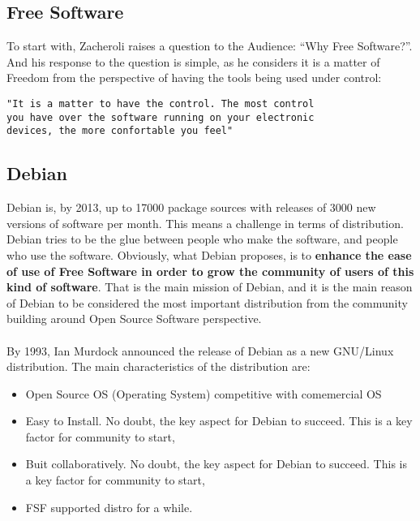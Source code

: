 \documentclass[11pt]{article}
\begin{document}
\subsection{Free Software}
To start with, Zacheroli raises a question to the Audience: ``Why Free Software?''. And his response to the question is simple, as he considers it is a matter of Freedom from the perspective of having the tools being used under control:
\begin{verbatim}
"It is a matter to have the control. The most control
you have over the software running on your electronic
devices, the more confortable you feel"
\end{verbatim}

\subsection{Debian}
Debian is, by 2013, up to 17000 package sources with releases of 3000 new versions of software per month. This means a challenge in terms of distribution. Debian tries to be the glue between people who make the software, and people who use the software. Obviously, what Debian proposes, is to \textbf{enhance the ease of use of Free Software in order to grow the community of users of this kind of software}. That is the main mission of Debian, and it is the main reason of Debian to be considered the most important distribution from the community building around Open Source Software perspective.\\
\\
By 1993, Ian Murdock announced the release of Debian as a new GNU/Linux distribution. The main characteristics of the distribution are:
\begin{itemize}\itemsep0pt
\item{Open Source OS (Operating System) competitive with comemercial OS}
\item{Easy to Install}. No doubt, the key aspect for Debian to succeed. This is a key factor for community to start, 
\item{Buit collaboratively}. No doubt, the key aspect for Debian to succeed. This is a key factor for community to start, 
\item{FSF supported distro for a while}.
\end{itemize}
\end{document}
